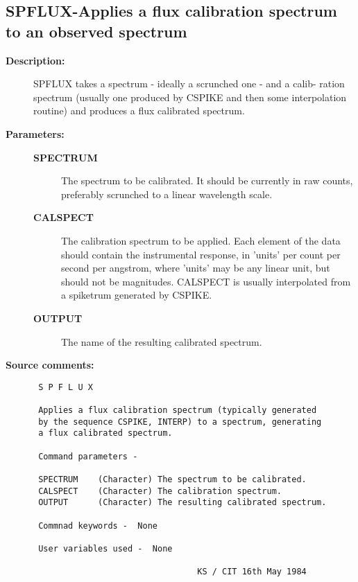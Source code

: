 \subsection{SPFLUX-\label{SPFLUX}Applies a flux calibration spectrum to an observed spectrum}
\begin{description}

\item [{\bf Description:}]
 SPFLUX takes a spectrum - ideally a scrunched one - and a calib-
 ration spectrum (usually one produced by CSPIKE and then some
 interpolation routine) and produces a flux calibrated spectrum.

\item [{\bf Parameters:}]
\begin{description}
\item [{\bf SPECTRUM}]
 The spectrum to be calibrated.  It should be
 currently in raw counts, preferably scrunched to a linear
 wavelength scale.
\item [{\bf CALSPECT}]
 The calibration spectrum to be applied.  Each
 element of the data should contain the instrumental
 response, in 'units' per count per second per angstrom,
 where 'units' may be any linear unit, but should not
 be magnitudes.  CALSPECT is usually interpolated from a
 spiketrum generated by CSPIKE.
\item [{\bf OUTPUT}]
 The name of the resulting calibrated spectrum.
\end{description}

\item [{\bf Source comments:}]
\begin{verbatim}
 S P F L U X

 Applies a flux calibration spectrum (typically generated
 by the sequence CSPIKE, INTERP) to a spectrum, generating
 a flux calibrated spectrum.

 Command parameters -

 SPECTRUM    (Character) The spectrum to be calibrated.
 CALSPECT    (Character) The calibration spectrum.
 OUTPUT      (Character) The resulting calibrated spectrum.

 Commnad keywords -  None

 User variables used -  None

                                 KS / CIT 16th May 1984
\end{verbatim}
\end{description}
